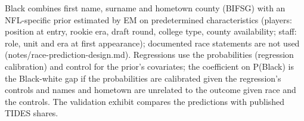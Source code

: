 \begin{table}[!h]
\begin{threeparttable}
\begin{tablenotes}[para]
Black combines first name, surname and hometown county (BIFSG) with an NFL-specific prior estimated by EM on predetermined characteristics (players: position at entry, rookie era, draft round, college type, county availability; staff: role, unit and era at first appearance); documented race statements are not used (notes/race-prediction-design.md). Regressions use the probabilities (regression calibration) and control for the prior's covariates; the coefficient on P(Black) is the Black-white gap if the probabilities are calibrated given the regression's controls and names and hometown are unrelated to the outcome given race and the controls. The validation exhibit compares the predictions with published TIDES shares.
\end{tablenotes}
\end{threeparttable}
\end{table}
